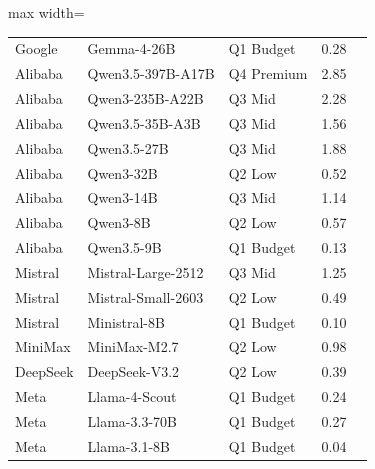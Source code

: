 \documentclass{article}
\begin{document}
\begin{table}[h]
\begin{adjustbox}{max width=\linewidth}
\begin{tabular}{lllrl}
Google     & Gemma-4-26B                   & Q1 Budget     &  0.28 & \citep{gemma2025gemma3} \\
Alibaba    & Qwen3.5-397B-A17B             & Q4 Premium &  2.85 & \citep{yang2025qwen3} \\
Alibaba    & Qwen3-235B-A22B               & Q3 Mid     &  2.28 & \citep{yang2025qwen3} \\
Alibaba    & Qwen3.5-35B-A3B               & Q3 Mid     &  1.56 & \citep{yang2025qwen3} \\
Alibaba    & Qwen3.5-27B                   & Q3 Mid     &  1.88 & \citep{yang2025qwen3} \\
Alibaba    & Qwen3-32B                     & Q2 Low     &  0.52 & \citep{yang2025qwen3} \\
Alibaba    & Qwen3-14B                     & Q3 Mid     &  1.14 & \citep{yang2025qwen3} \\
Alibaba    & Qwen3-8B                      & Q2 Low     &  0.57 & \citep{yang2025qwen3} \\
Alibaba    & Qwen3.5-9B                    & Q1 Budget  &  0.13 & \citep{yang2025qwen3} \\
Mistral    & Mistral-Large-2512            & Q3 Mid     &  1.25 & \citep{mistral2025large3} \\
Mistral    & Mistral-Small-2603            & Q2 Low     &  0.49 & \citep{mistral2026small4} \\
Mistral    & Ministral-8B                  & Q1 Budget  &  0.10 & \citep{mistral2024ministral} \\
MiniMax    & MiniMax-M2.7                  & Q2 Low     &  0.98 & \citep{minimax2025m27} \\
DeepSeek   & DeepSeek-V3.2                 & Q2 Low     &  0.39 & \citep{deepseek2024v3} \\
Meta       & Llama-4-Scout                 & Q1 Budget  &  0.24 & \citep{meta2025llama4} \\
Meta       & Llama-3.3-70B                 & Q1 Budget  &  0.27 & \citep{grattafiori2024llama3} \\
Meta       & Llama-3.1-8B                  & Q1 Budget  &  0.04 & \citep{grattafiori2024llama3} \\
\bottomrule
\end{tabular}
\end{adjustbox}
\end{table}

\end{document}

